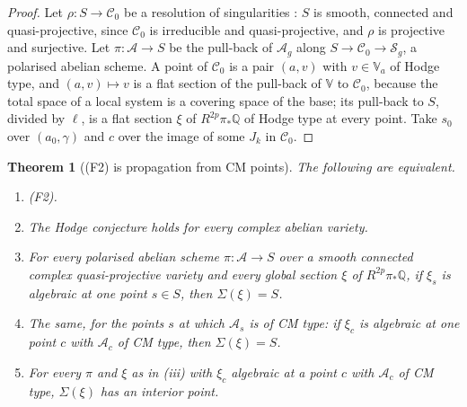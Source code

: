 \documentclass[11pt,reqno]{amsart}
\theoremstyle{plain}
\newtheorem{theorem}{Theorem}[section]
\theoremstyle{definition}
\theoremstyle{remark}
\newcommand{\QQ}{\mathbb{Q}}
\newcommand{\cA}{\mathcal{A}}
\newcommand{\cS}{\mathcal{S}}
\begin{document}
\begin{proof}
Let $\rho\colon S\to\mathcal{C}_{0}$ be a resolution of singularities
\cite{Hir64}: $S$ is smooth, connected and quasi-projective, since
$\mathcal{C}_{0}$ is irreducible and quasi-projective, and $\rho$ is
projective and surjective. Let $\pi\colon\cA\to S$ be the pull-back of
$\cA_{g}$ along $S\to\mathcal{C}_{0}\to\cS_{g}$, a polarised abelian scheme.
A point of $\mathcal{C}_{0}$ is a pair $(a,v)$ with $v\in\mathbb{V}_{a}$ of
Hodge type, and $(a,v)\mapsto v$ is a flat section of the pull-back of
$\mathbb{V}$ to $\mathcal{C}_{0}$, because the total space of a local system
is a covering space of the base; its pull-back to $S$, divided by $\ell$, is
a flat section $\xi$ of $R^{2p}\pi_{*}\QQ$ of Hodge type at every point.
Take $s_{0}$ over $(a_{0},\gamma)$ and $c$ over the image of some $J_{k}$ in
$\mathcal{C}_{0}$.
\end{proof}

\begin{theorem}[(F2) is propagation from CM points]\label{thm:f2propagation}
The following are equivalent.
\begin{enumerate}[label=\textup{(\roman*)},leftmargin=2.6em,itemsep=2pt]
\item \textup{(F2)}.
\item The Hodge conjecture holds for every complex abelian variety.
\item For every polarised abelian scheme $\pi\colon\cA\to S$ over a smooth
  connected complex quasi-projective variety and every global section $\xi$
  of $R^{2p}\pi_{*}\QQ$, if $\xi_{s}$ is algebraic at one point $s\in S$,
  then $\Sigma(\xi)=S$.
\item The same, for the points $s$ at which $\cA_{s}$ is of CM type: if
  $\xi_{c}$ is algebraic at one point $c$ with $\cA_{c}$ of CM type, then
  $\Sigma(\xi)=S$.
\item For every $\pi$ and $\xi$ as in \textup{(iii)} with $\xi_{c}$ algebraic
  at a point $c$ with $\cA_{c}$ of CM type, $\Sigma(\xi)$ has an interior
  point.
\end{enumerate}
\end{theorem}
\end{document}
